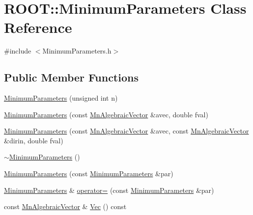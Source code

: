 \hypertarget{classROOT_1_1Minuit2_1_1MinimumParameters}{}\section{R\+O\+OT\+:\+:Minimum\+Parameters Class Reference}
\label{classROOT_1_1Minuit2_1_1MinimumParameters}


{\ttfamily \#include $<$Minimum\+Parameters.\+h$>$}

\subsection*{Public Member Functions}
\begin{DoxyCompactItemize}
\item 
\mbox{\hyperlink{classROOT_1_1Minuit2_1_1MinimumParameters_aa6d319726e98ab129fea9d93268a21da}{Minimum\+Parameters}} (unsigned int n)
\item 
\mbox{\hyperlink{classROOT_1_1Minuit2_1_1MinimumParameters_a72fd528946a07bcf3e320c0505953aa8}{Minimum\+Parameters}} (const \mbox{\hyperlink{namespaceROOT_1_1Minuit2_a62ed97730a1ca8d3fbaec64a19aa11c9}{Mn\+Algebraic\+Vector}} \&avec, double fval)
\item 
\mbox{\hyperlink{classROOT_1_1Minuit2_1_1MinimumParameters_ad771c737e802f1f6a6f01b94dd249ef7}{Minimum\+Parameters}} (const \mbox{\hyperlink{namespaceROOT_1_1Minuit2_a62ed97730a1ca8d3fbaec64a19aa11c9}{Mn\+Algebraic\+Vector}} \&avec, const \mbox{\hyperlink{namespaceROOT_1_1Minuit2_a62ed97730a1ca8d3fbaec64a19aa11c9}{Mn\+Algebraic\+Vector}} \&dirin, double fval)
\item 
\mbox{\hyperlink{classROOT_1_1Minuit2_1_1MinimumParameters_a1e7d7b8ed914bec0a2e4f68642b9a377}{$\sim$\+Minimum\+Parameters}} ()
\item 
\mbox{\hyperlink{classROOT_1_1Minuit2_1_1MinimumParameters_a5cea4660328847c3eb5ebc48041acc4c}{Minimum\+Parameters}} (const \mbox{\hyperlink{classROOT_1_1Minuit2_1_1MinimumParameters}{Minimum\+Parameters}} \&par)
\item 
\mbox{\hyperlink{classROOT_1_1Minuit2_1_1MinimumParameters}{Minimum\+Parameters}} \& \mbox{\hyperlink{classROOT_1_1Minuit2_1_1MinimumParameters_a60b35f7b9d6b7e49d2573581a3a9f081}{operator=}} (const \mbox{\hyperlink{classROOT_1_1Minuit2_1_1MinimumParameters}{Minimum\+Parameters}} \&par)
\item 
const \mbox{\hyperlink{namespaceROOT_1_1Minuit2_a62ed97730a1ca8d3fbaec64a19aa11c9}{Mn\+Algebraic\+Vector}} \& \mbox{\hyperlink{classROOT_1_1Minuit2_1_1MinimumParameters_ad93c17d14f4ddbc66c91107ff3a80dbe}{Vec}} () const

\end{DoxyCompactItemize}
